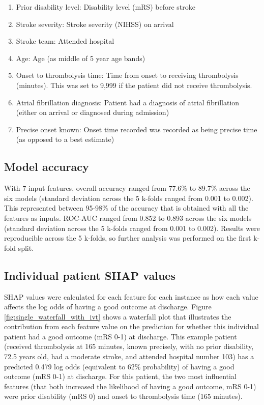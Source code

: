 \begin{enumerate}
    \item Prior disability level: Disability level (mRS) before stroke
    \item Stroke severity: Stroke severity (NIHSS) on arrival
    \item Stroke team: Attended hospital
    \item Age: Age (as middle of 5 year age bands)
    \item Onset to thrombolysis time: Time from onset to receiving thrombolysis (minutes). This was set to 9,999 if the patient did not receive thrombolysis.
    \item Atrial fibrillation diagnosis: Patient had a diagnosis of atrial fibrillation (either on arrival or diagnosed during admission)
    \item Precise onset known: Onset time recorded was recorded as being precise time (as opposed to a best estimate)
\end{enumerate}


\subsection{Model accuracy}

With 7 input features, overall accuracy ranged from 77.6\% to 89.7\% across the six models (standard deviation across the 5 k-folds ranged from 0.001 to 0.002). This represented between 95-98\% of the accuracy that is obtained with all the features as inputs. ROC-AUC ranged from 0.852 to 0.893 across the six models (standard deviation across the 5 k-folds ranged from 0.001 to 0.002). Results were reproducible across the 5 k-folds, so further analysis was performed on the first k-fold split.


\subsection{Individual patient SHAP values}

SHAP values were calculated for each feature for each instance as how each value affects the log odds of having a good outcome at discharge. Figure \ref{fig:single_waterfall_with_ivt} shows a waterfall plot that illustrates the contribution from each feature value on the prediction for whether this individual patient had a good outcome (mRS 0-1) at discharge. This example patient (received thrombolysis at 165 minutes, known precisely, with no prior disability, 72.5 years old, had a moderate stroke, and attended hospital number 103) has a predicted 0.479 log odds (equivalent to 62\% probability) of having a good outcome (mRS 0-1) at discharge. For this patient, the two most influential features (that both increased the likelihood of having a good outcome, mRS 0-1) were prior disability (mRS 0) and onset to thrombolysis time (165 minutes).

